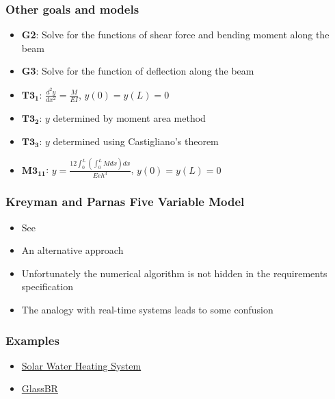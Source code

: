 \documentclass[t,12pt,numbers,fleqn]{beamer}
\begin{document}

\begin{frame}
\frametitle{Other goals and models}
\begin{itemize}
\item \textbf{G2}: Solve for the functions of shear force and bending moment along the beam
\item \textbf{G3}: Solve for the function of deflection along the beam
\item $\mathbf{T3_1}$: $\frac{d^2 y}{d x^2} = \frac{M}{EI}$, $y(0) = y(L) = 0$
\item $\mathbf{T3_2}$: $y$ determined by moment area method
\item $\mathbf{T3_3}$: $y$ determined using Castigliano's theorem
\item $\mathbf{M3_{11}}$: $y = \frac{12 \int_0^L (\int_0^L M dx) dx}{Eeh^3}$, $y(0) = y(L) = 0$
\end{itemize}
\end{frame}


\begin{frame}
\frametitle{Kreyman and Parnas Five Variable Model}
\begin{itemize}
\item See \cite{KreymanAndParnas2002}
\item An alternative approach
\item Unfortunately the numerical algorithm is not hidden in the requirements specification
\item The analogy with real-time systems leads to some confusion
\end{itemize}
\end{frame}


\begin{frame}
\frametitle{Examples}
\begin{itemize}
\item \href{https://github.com/smiths/swhs}{Solar Water Heating System}
\item \href{https://github.com/smiths/caseStudies/tree/master/CaseStudies/glass/docs/SRS}{GlassBR}
\end{itemize}
\end{frame}

\end{document}
